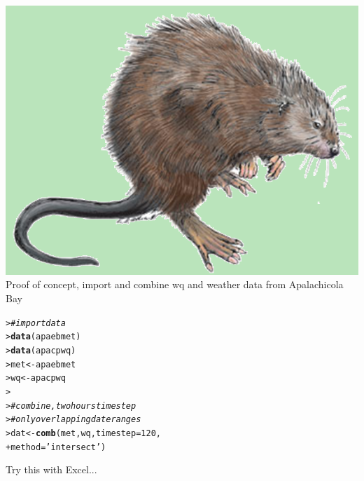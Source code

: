\documentclass[serif]{beamer}\usepackage[]{graphicx}\usepackage[]{color}
\makeatletter
\newcommand{\hlnum}[1]{\textcolor[rgb]{0.686,0.059,0.569}{#1}}%
\newcommand{\hlstr}[1]{\textcolor[rgb]{0.192,0.494,0.8}{#1}}%
\newcommand{\hlcom}[1]{\textcolor[rgb]{0.678,0.584,0.686}{\textit{#1}}}%
\newcommand{\hlstd}[1]{\textcolor[rgb]{0.345,0.345,0.345}{#1}}%
\newcommand{\hlkwb}[1]{\textcolor[rgb]{0.69,0.353,0.396}{#1}}%
\newcommand{\hlkwc}[1]{\textcolor[rgb]{0.333,0.667,0.333}{#1}}%
\newcommand{\hlkwd}[1]{\textcolor[rgb]{0.737,0.353,0.396}{\textbf{#1}}}%
\newenvironment{kframe}{%
 \def\at@end@of@kframe{}%
 \ifinner\ifhmode%
  \def\at@end@of@kframe{\end{minipage}}%
  \begin{minipage}{\columnwidth}%
 \fi\fi%
 \def\FrameCommand##1{\hskip\@totalleftmargin \hskip-\fboxsep
 \colorbox{shadecolor}{##1}\hskip-\fboxsep
     \hskip-\linewidth \hskip-\@totalleftmargin \hskip\columnwidth}%
 \MakeFramed {\advance\hsize-\width
   \@totalleftmargin\z@ \linewidth\hsize
   \@setminipage}}%
 {\par\unskip\endMakeFramed%
 \at@end@of@kframe}
\newenvironment{knitrout}{}{} %
\makeatother
\begin{document}
\begin{frame}[fragile]{\includegraphics[width=0.05\paperwidth]{fig/muskrat.png}\hspace{0.07in}{\bf SWMPrats.net: The SWMPr package}}
Proof of concept, import and combine wq and weather data from Apalachicola Bay
\begin{knitrout}
\color{fgcolor}\begin{kframe}
\begin{alltt}
\hlstd{> }\hlcom{# import data}
\hlstd{> }\hlkwd{data}\hlstd{(apaebmet)}
\hlstd{> }\hlkwd{data}\hlstd{(apacpwq)}
\hlstd{> }\hlstd{met} \hlkwb{<-} \hlstd{apaebmet}
\hlstd{> }\hlstd{wq} \hlkwb{<-} \hlstd{apacpwq}
\hlstd{> }
\hlstd{> }\hlcom{# combine, two hours time step}
\hlstd{> }\hlcom{# only overlapping date ranges}
\hlstd{> }\hlstd{dat} \hlkwb{<-} \hlkwd{comb}\hlstd{(met, wq,} \hlkwc{timestep} \hlstd{=} \hlnum{120}\hlstd{,}
\hlstd{+ }  \hlkwc{method} \hlstd{=} \hlstr{'intersect'}\hlstd{)}
\end{alltt}
\end{kframe}
\end{knitrout}
Try this with Excel...
\end{frame}
\end{document}
